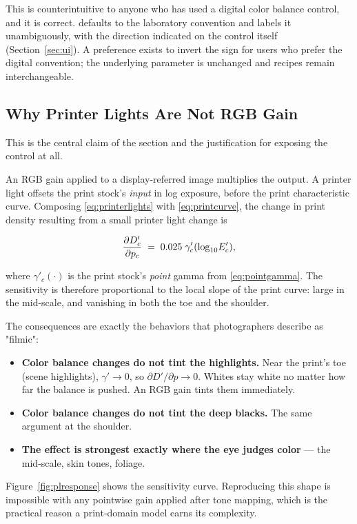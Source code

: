 This is counterintuitive to anyone who has used a digital color balance control,
and it is correct. \EM{} defaults to the laboratory convention and labels it
unambiguously, with the direction indicated on the control itself
(Section~\ref{sec:ui}). A preference exists to invert the sign for users who
prefer the digital convention; the underlying parameter is unchanged and
recipes remain interchangeable.

\subsection{Why Printer Lights Are Not RGB Gain}

This is the central claim of the section and the justification for exposing the
control at all.

An RGB gain applied to a display-referred image multiplies the output. A printer
light offsets the print stock's \emph{input} in log exposure, before the print
characteristic curve. Composing \eqref{eq:printerlights} with
\eqref{eq:printcurve}, the change in print density resulting from a small
printer light change is

\begin{equation}
\frac{\partial D'_c}{\partial p_c} \;=\; 0.025\;\gamma'_c(\log_{10}\!E'_c),
\label{eq:plsensitivity}
\end{equation}

where $\gamma'_c(\cdot)$ is the print stock's \emph{point} gamma from
\eqref{eq:pointgamma}. The sensitivity is therefore proportional to the local
slope of the print curve: large in the mid-scale, and vanishing in both the toe
and the shoulder.

The consequences are exactly the behaviors that photographers describe as
"filmic":

\begin{itemize}
\item \textbf{Color balance changes do not tint the highlights.} Near the
print's toe (scene highlights), $\gamma' \to 0$, so
$\partial D'/\partial p \to 0$. Whites stay white no matter how far the balance
is pushed. An RGB gain tints them immediately.
\item \textbf{Color balance changes do not tint the deep blacks.} The same
argument at the shoulder.
\item \textbf{The effect is strongest exactly where the eye judges color} ---
the mid-scale, skin tones, foliage.
\end{itemize}

Figure~\ref{fig:plresponse} shows the sensitivity curve. Reproducing this shape
is impossible with any pointwise gain applied after tone mapping, which is the
practical reason a print-domain model earns its complexity.


